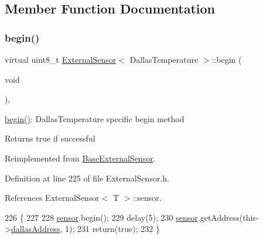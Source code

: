\subsection{Member Function Documentation}
\mbox{\label{classExternalSensor_3_01DallasTemperature_01_4_ac5275129b05e2ff8df45d5b222a661d9}} 
\subsubsection{\texorpdfstring{begin()}{begin()}}
{\footnotesize\ttfamily virtual uint8\+\_\+t \hyperlink{classExternalSensor}{External\+Sensor}$<$ Dallas\+Temperature $>$\+::begin (\begin{DoxyParamCaption}\item[{void}]{ }\end{DoxyParamCaption})\hspace{0.3cm}{\ttfamily [inline]}, {\ttfamily [virtual]}}

\hyperlink{classExternalSensor_3_01DallasTemperature_01_4_ac5275129b05e2ff8df45d5b222a661d9}{begin()}\+: Dallas\+Temperature specific begin method

\begin{DoxyReturn}{Returns}
true if successful 
\end{DoxyReturn}


Reimplemented from \hyperlink{classBaseExternalSensor_a87d132803d4f4fdd4e66332809f0c9a0}{Base\+External\+Sensor}.



Definition at line 225 of file External\+Sensor.\+h.



References External\+Sensor$<$ T $>$\+::sensor.


\begin{DoxyCode}
226     \{
227         
228         \hyperlink{classExternalSensor_3_01DallasTemperature_01_4_adb6ba4fcdedef95ad8f6b0c9b6c0f9d1}{sensor}.begin(); 
229         delay(5);
230         \hyperlink{classExternalSensor_3_01DallasTemperature_01_4_adb6ba4fcdedef95ad8f6b0c9b6c0f9d1}{sensor}.getAddress(this->\hyperlink{classExternalSensor_3_01DallasTemperature_01_4_a7d9e9d2893e453638fcf440e5d8d9082}{dallasAddress}, 1);   
231         \textcolor{keywordflow}{return}(\textcolor{keyword}{true});
232     \}
\end{DoxyCode}
\mbox{\label{classExternalSensor_3_01DallasTemperature_01_4_a127ead06440ec972c22db2abeb8e2b51}} 
